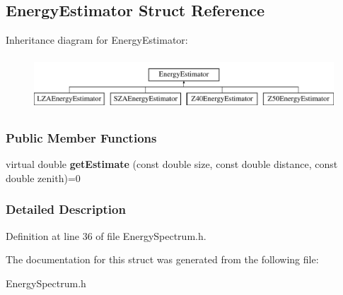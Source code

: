 \hypertarget{structEnergyEstimator}{
\subsection{EnergyEstimator Struct Reference}
\label{structEnergyEstimator}
}
Inheritance diagram for EnergyEstimator:\begin{figure}[H]
\begin{center}
\leavevmode
\includegraphics[height=2.000000cm]{structEnergyEstimator}
\end{center}
\end{figure}
\subsubsection*{Public Member Functions}
\begin{DoxyCompactItemize}
\item 
\hypertarget{structEnergyEstimator_a72b73d1cdaa39c43e6ec4a80a9e74aaa}{
virtual double {\bfseries getEstimate} (const double size, const double distance, const double zenith)=0}
\label{structEnergyEstimator_a72b73d1cdaa39c43e6ec4a80a9e74aaa}

\end{DoxyCompactItemize}


\subsubsection{Detailed Description}


Definition at line 36 of file EnergySpectrum.h.



The documentation for this struct was generated from the following file:\begin{DoxyCompactItemize}
\item 
EnergySpectrum.h\end{DoxyCompactItemize}
